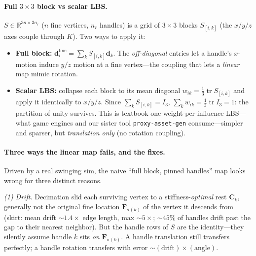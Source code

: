 \paragraph{Full $3\times3$ block vs scalar LBS.}
$S\in\mathbb R^{3n\times3n_r}$ ($n$ fine vertices, $n_r$ handles) is a grid of $3\times3$ blocks $S_{[i,k]}$ (the $x/y/z$ axes couple through $K$).
Two ways to apply it:
\begin{itemize}
  \item \textbf{Full block:} $\mathbf d_i^{\text{fine}}=\sum_k S_{[i,k]}\mathbf d_k$.
        The \emph{off-diagonal} entries let a handle's $x$-motion induce $y/z$ motion at a fine vertex---the coupling that lets a \emph{linear} map mimic rotation.
  \item \textbf{Scalar LBS:} collapse each block to its mean diagonal $w_{ik}=\tfrac13\operatorname{tr}S_{[i,k]}$ and apply it identically to $x/y/z$.
        Since $\sum_k S_{[i,k]}=I_3$, $\sum_k w_{ik}=\tfrac13\operatorname{tr}I_3=1$: the partition of unity survives.
        This is textbook one-weight-per-influence LBS---what game engines and our sister tool \texttt{proxy-asset-gen} consume---simpler and sparser, but \emph{translation only} (no rotation coupling).
\end{itemize}

\paragraph{Three ways the linear map fails, and the fixes.}
Driven by a real swinging sim, the naive ``full block, pinned handles'' map looks wrong for three distinct reasons.

\emph{(1) Drift.}
Decimation slid each surviving vertex to a stiffness-\emph{optimal} rest $\mathbf C_k$, generally not the original fine location $\mathbf F_{\sigma(k)}$ of the vertex it descends from (skirt: mean drift ${\sim}1.4\times$ edge length, max ${\sim}5\times$; ${\sim}45\%$ of handles drift past the gap to their nearest neighbor).
But the handle rows of $S$ are the identity---they silently assume handle $k$ sits \emph{on} $\mathbf F_{\sigma(k)}$.
A handle translation still transfers perfectly; a handle rotation transfers with error $\sim(\text{drift})\times(\text{angle})$.

